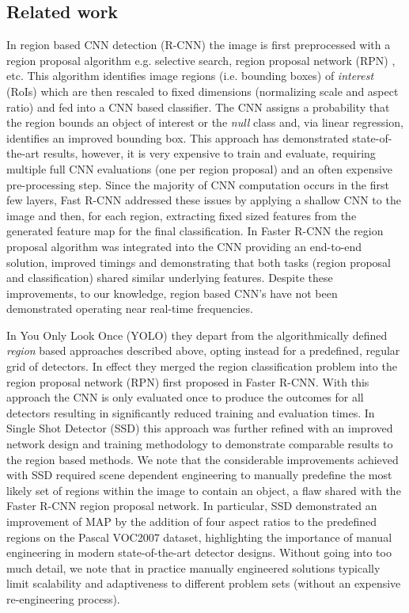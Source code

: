 \documentclass[10pt,twocolumn]{article}
\begin{document}
\subsection{Related work} \label{sec:related_work}

In region based CNN detection (R-CNN)\cite{rcnn} the image is first preprocessed with a region proposal algorithm e.g. selective search\cite{ssearch}, region proposal network (RPN) \cite{faster-rcnn}, etc. This algorithm identifies image regions (i.e. bounding boxes) of \textit{interest} (RoIs) which are then rescaled to fixed dimensions (normalizing scale and aspect ratio) and fed into a CNN based classifier. The CNN assigns a probability that the region bounds an object of interest or the \textit{null} class and, via linear regression, identifies an improved bounding box. This approach has demonstrated state-of-the-art results, however, it is very expensive to train and evaluate, requiring multiple full CNN evaluations (one per region proposal) and an often expensive pre-processing step. Since the majority of CNN computation occurs in the first few layers, Fast R-CNN\cite{fast-rcnn} addressed these issues by applying a shallow CNN to the image and then, for each region, extracting fixed sized features from the generated feature map for the final classification. In Faster R-CNN\cite{faster-rcnn} the region proposal algorithm was integrated into the CNN providing an end-to-end solution, improved timings and demonstrating that both tasks (region proposal and classification) shared similar underlying features. Despite these improvements, to our knowledge, region based CNN's have not been demonstrated operating near real-time frequencies.

In You Only Look Once (YOLO)\cite{yolo} they depart from the algorithmically defined \textit{region} based approaches described above, opting instead for a predefined, regular grid of detectors. In effect they merged the region classification problem into the region proposal network (RPN) first proposed in Faster R-CNN. With this approach the CNN is only evaluated once to produce the outcomes for all detectors resulting in significantly reduced training and evaluation times. In Single Shot Detector (SSD)\cite{ssd} this approach was further refined with an improved network design and training methodology to demonstrate comparable results to the region based methods. We note that the considerable improvements achieved with SSD required scene dependent engineering to manually predefine the most likely set of regions within the image to contain an object, a flaw shared with the Faster R-CNN region proposal network. In particular, SSD demonstrated an improvement of  MAP\cite{ssd} by the addition of four aspect ratios to the predefined regions on the Pascal VOC2007\cite{pascal-voc} dataset, highlighting the importance of manual engineering in modern state-of-the-art detector designs. Without going into too much detail, we note that in practice manually engineered solutions typically limit scalability and adaptiveness to different problem sets (without an expensive re-engineering process).
\end{document}
